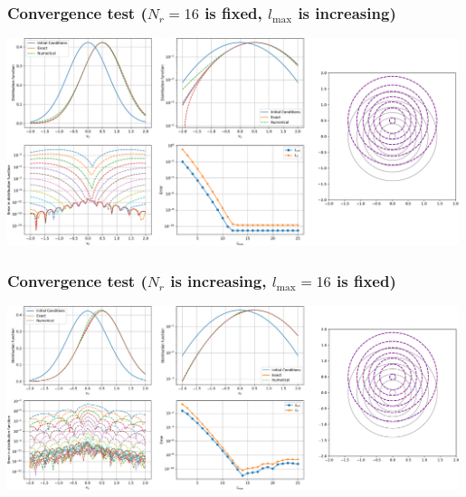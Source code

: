 \documentclass[mathserif, aspectratio=169]{beamer}
\newcommand{\vect}[1]{\boldsymbol{#1}}
\newcommand{\of}[1]{\mleft( #1 \mright)}
\begin{document}
\begin{frame}
\frametitle{\small Convergence test ($N_r = 16$ is fixed, $l_{\max}$ is increasing)}
\begin{center}
\includegraphics[width=0.99\textwidth]{figures/advection_operator_changing_lmax}
\end{center}
\end{frame}

\begin{frame}
\frametitle{\small Convergence test ($N_r$ is increasing, $l_{\max} = 16$ is fixed)}
\begin{center}
\includegraphics[width=0.99\textwidth]{figures/advection_operator_changing_nr}
\end{center}
\end{frame}
\end{document}
